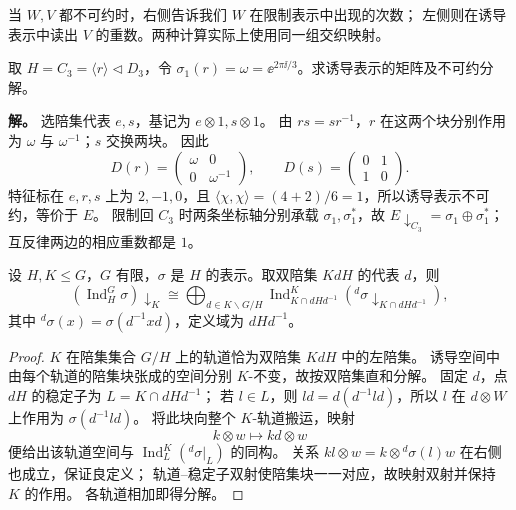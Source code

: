 当 $W,V$ 都不可约时，右侧告诉我们 $W$ 在限制表示中出现的次数；
左侧则在诱导表示中读出 $V$ 的重数。两种计算实际上使用同一组交织映射。

\begin{example}
取 $H=C_3=\langle r\rangle\triangleleft D_3$，令
$\sigma_1(r)=\omega=\ee^{2\pi\ii/3}$。求诱导表示的矩阵及不可约分解。

\textbf{解。} 选陪集代表 $e,s$，基记为 $e\otimes1,s\otimes1$。
由 $rs=sr^{-1}$，$r$ 在这两个块分别作用为 $\omega$ 与 $\omega^{-1}$；$s$ 交换两块。
因此
\[
D(r)=\begin{pmatrix}\omega&0\\0&\omega^{-1}\end{pmatrix},\qquad
D(s)=\begin{pmatrix}0&1\\1&0\end{pmatrix}.
\]
特征标在 $e,r,s$ 上为 $2,-1,0$，且
$\langle\chi,\chi\rangle=(4+2)/6=1$，所以诱导表示不可约，等价于 $E$。
限制回 $C_3$ 时两条坐标轴分别承载 $\sigma_1,\sigma_1^*$，故
$E\downarrow_{C_3}=\sigma_1\oplus\sigma_1^*$；互反律两边的相应重数都是 $1$。
\end{example}

\begin{theorem}
设 $H,K\le G$，$G$ 有限，$\sigma$ 是 $H$ 的表示。取双陪集 $KdH$ 的代表 $d$，则
\begin{equation}
\left(\operatorname{Ind}_H^G\sigma\right)\downarrow_K
\cong\bigoplus_{d\in K\backslash G/H}
\operatorname{Ind}_{K\cap dHd^{-1}}^K
\left({}^{d}\sigma\downarrow_{K\cap dHd^{-1}}\right),
\label{eq:mackey-restriction}
\end{equation}
其中 ${}^{d}\sigma(x)=\sigma(d^{-1}xd)$，定义域为 $dHd^{-1}$。
\end{theorem}

\begin{proof}
$K$ 在陪集集合 $G/H$ 上的轨道恰为双陪集 $KdH$ 中的左陪集。
诱导空间中由每个轨道的陪集块张成的空间分别 $K$-不变，故按双陪集直和分解。
固定 $d$，点 $dH$ 的稳定子为 $L=K\cap dHd^{-1}$；
若 $l\in L$，则 $ld=d(d^{-1}ld)$，所以 $l$ 在 $d\otimes W$ 上作用为 $\sigma(d^{-1}ld)$。
将此块向整个 $K$-轨道搬运，映射
\[
k\otimes w\longmapsto kd\otimes w
\]
便给出该轨道空间与 $\operatorname{Ind}_L^K({}^{d}\sigma|_L)$ 的同构。
关系 $kl\otimes w=k\otimes{}^{d}\sigma(l)w$ 在右侧也成立，保证良定义；
轨道--稳定子双射使陪集块一一对应，故映射双射并保持 $K$ 的作用。
各轨道相加即得分解。
\end{proof}

